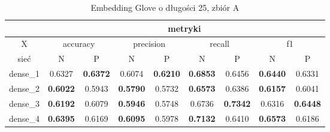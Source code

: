 \begin{table}[hp] \centering
    \caption{Embedding Glove o długości 25, zbiór A}
    \label{tab:wyniki_glove_A}
    \begin{tabular} {|c|c|c|c|c|c|c|c|c| }    \hline
                 & \multicolumn{8}{c|}{metryki}                                                                                                                                                                                                                                                                                  \\ \hline
        X        & \multicolumn{2}{c|}{accuracy}       & \multicolumn{2}{c|}{precision}      & \multicolumn{2}{c|}{recall}         & \multicolumn{2}{c|}{f1}                                                                                                                                                                     \\ \hline
        sieć     & N                                   & P                                   & N                                   & P                                   & N                                   & P                                   & N                                   & P                                   \\ \hline
        dense\_1 & 0.6327                              & \textbf{0.6372}                     & 0.6074                              & \textbf{0.6210}                     & \textbf{0.6853}                     & 0.6456                              & \textbf{0.6440}                     & 0.6331                              \\ \hline
        dense\_2 & \textbf{0.6022}                     & 0.5943                              & \textbf{0.5790}                     & 0.5732                              & \textbf{0.6573}                     & 0.6386                              & \textbf{0.6157}                     & 0.6041                              \\ \hline
        dense\_3 & \textbf{0.6192}                     & 0.6079                              & \textbf{0.5946}                     & 0.5748                              & 0.6736                              & \textbf{0.7342}                     & 0.6316                              & \textbf{0.6448}                     \\ \hline
        dense\_4 & \textbf{0.6395}                     & 0.6169                              & \textbf{0.6095}                     & 0.5978                              & \textbf{0.7132}                     & 0.6410                              & \textbf{0.6573}                     & 0.6186                              \\ \hline

\end{tabular}
\end{table}
